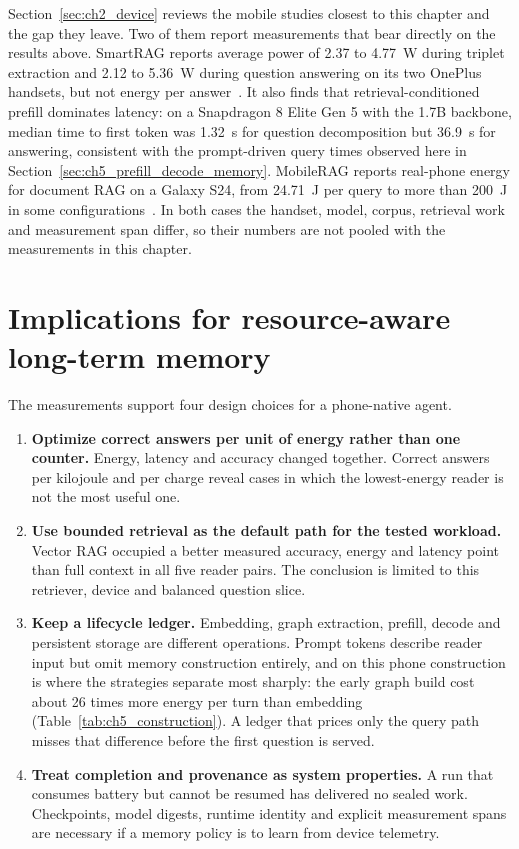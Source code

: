 Section~\ref{sec:ch2_device} reviews the mobile studies closest to this chapter and the gap
they leave. Two of them report measurements that bear directly on the results above.
SmartRAG reports average power of 2.37 to 4.77~W during triplet extraction and 2.12 to
5.36~W during question answering on its two OnePlus handsets, but not energy per
answer~\citep{smartrag}. It also finds that retrieval-conditioned prefill dominates latency:
on a Snapdragon 8 Elite Gen 5 with the 1.7B backbone, median time to first token was 1.32~s
for question decomposition but 36.9~s for answering, consistent with the prompt-driven query
times observed here in Section~\ref{sec:ch5_prefill_decode_memory}. MobileRAG reports real-phone energy
for document RAG on a Galaxy S24, from 24.71~J per query to more than 200~J in some
configurations~\citep{mobilerag_energy}.
In both cases the handset, model, corpus, retrieval work and measurement span differ, so
their numbers are not pooled with the measurements in this chapter.

\section{Implications for resource-aware long-term memory}
\label{sec:ch5_implications}

The measurements support four design choices for a phone-native agent.

\begin{enumerate}
  \item \textbf{Optimize correct answers per unit of energy rather than one counter.} Energy, latency and
  accuracy changed together. Correct answers per kilojoule and per charge reveal cases
  in which the lowest-energy reader is not the most useful one.

  \item \textbf{Use bounded retrieval as the default path for the tested workload.}
  Vector RAG occupied a better measured accuracy, energy and latency point than full
  context in all five reader pairs. The conclusion is limited to this retriever, device
  and balanced question slice.

  \item \textbf{Keep a lifecycle ledger.} Embedding, graph extraction, prefill, decode
  and persistent storage are different operations. Prompt tokens describe reader input
  but omit memory construction entirely, and on this phone construction is where the
  strategies separate most sharply: the early graph build cost about 26 times more energy per
  turn than embedding (Table~\ref{tab:ch5_construction}). A ledger that prices only the query
  path misses that difference before the first question is served.

  \item \textbf{Treat completion and provenance as system properties.} A run that
  consumes battery but cannot be resumed has delivered no sealed work. Checkpoints,
  model digests, runtime identity and explicit measurement spans are necessary if a
  memory policy is to learn from device telemetry.
\end{enumerate}

